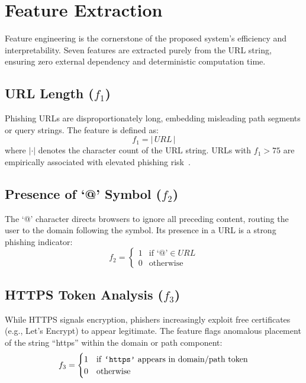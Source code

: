 \documentclass[conference]{IEEEtran}
\begin{document}
\section{Feature Extraction}
\label{sec:features}

Feature engineering is the cornerstone of the proposed system's 
efficiency and interpretability. Seven features are extracted purely 
from the URL string, ensuring zero external dependency and 
deterministic computation time.

\subsection{URL Length ($f_1$)}
Phishing URLs are disproportionately long, embedding misleading 
path segments or query strings. The feature is defined as:
\begin{equation}
    f_1 = \lvert\, URL \,\rvert
    \label{eq:length}
\end{equation}
where $|\cdot|$ denotes the character count of the URL string. 
URLs with $f_1 > 75$ are empirically associated with elevated 
phishing risk~\cite{buber2018}.

\subsection{Presence of `@' Symbol ($f_2$)}
The `@' character directs browsers to ignore all preceding content, 
routing the user to the domain following the symbol. Its presence 
in a URL is a strong phishing indicator:
\begin{equation}
    f_2 = \begin{cases}
        1 & \text{if } \texttt{`@'} \in URL \\
        0 & \text{otherwise}
    \end{cases}
    \label{eq:at}
\end{equation}

\subsection{HTTPS Token Analysis ($f_3$)}
While HTTPS signals encryption, phishers increasingly exploit free 
certificates (e.g., Let's Encrypt) to appear legitimate. The 
feature flags anomalous placement of the string ``https'' within 
the domain or path component:
\begin{equation}
    f_3 = \begin{cases}
        1 & \text{if \texttt{`https'} appears in domain/path token} \\
        0 & \text{otherwise}
    \end{cases}
    \label{eq:https}
\end{equation}
\end{document}
